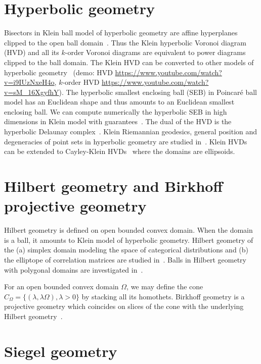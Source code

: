 \documentclass[11pt]{article}
\begin{document}
\section*{Hyperbolic geometry}
Bisectors in Klein ball model of hyperbolic geometry are affine hyperplanes clipped to the open ball domain~\cite{nielsen2010hyperbolic}.
Thus the Klein hyperbolic Voronoi diagram (HVD) and all its $k$-order Voronoi diagrams are equivalent to  power diagrams clipped to the ball domain.
The Klein HVD can be converted to other models of hyperbolic geometry~\cite{nielsen2014visualizing} (demo: HVD \url{https://www.youtube.com/watch?v=i9IUzNxeH4o}, $k$-order HVD \url{https://www.youtube.com/watch?v=sM_16XgyfhY}). 
The hyperbolic smallest enclosing  ball (SEB) in Poincar\'e ball model has an Euclidean shape and thus amounts to an Euclidean smallest enclosing ball.
We can compute numerically the hyperbolic SEB in high dimensions in Klein model with guarantees~\cite{nielsen2015approximating}.
The dual of the HVD is the hyperbolic Delaunay complex~\cite{nielsen2020voronoi}. 
Klein Riemannian geodesics, general position and degeneracies of point sets in hyperbolic geometry are studied in~\cite{nielsen2014further}.
Klein HVDs can be extended to Cayley-Klein HVDs~\cite{nielsen2016classification} where the domains are ellipsoids.

\section*{Hilbert geometry and Birkhoff projective geometry}

Hilbert geometry is defined on open bounded convex domain. When the domain is a ball, it amounts to Klein model of hyperbolic geometry.
Hilbert geometry of the (a) simplex domain modeling the space of categorical distributions and (b) the elliptope of correlation matrices are studied in~\cite{nielsen2019clustering,nielsen2023non}. 
Balls in Hilbert geometry with polygonal domains are investigated in~\cite{nielsen2017balls}.

For an open bounded convex domain $\Omega$, we may define the cone $C_\Omega=\{(\lambda,\lambda\Omega), \lambda>0\}$ by stacking all its homothets. Birkhoff geometry is a projective geometry which coincides on slices of the cone with the underlying Hilbert geometry~\cite{nielsen2023fisher}.


 
\section*{Siegel geometry}
\end{document}
